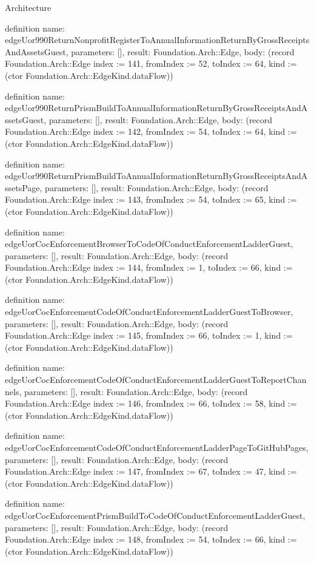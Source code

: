\begin{lexlean}{Architecture}
\begin{semanticmodule}
definition{
  name: edgeUor990ReturnNonprofitRegisterToAnnualInformationReturnByGrossReceiptsAndAssetsGuest,
  parameters: [],
  result: Foundation.Arch::Edge,
  body: (record Foundation.Arch::Edge {index := 141, fromIndex := 52, toIndex := 64, kind := (ctor Foundation.Arch::EdgeKind.dataFlow)})
}

definition{
  name: edgeUor990ReturnPrismBuildToAnnualInformationReturnByGrossReceiptsAndAssetsGuest,
  parameters: [],
  result: Foundation.Arch::Edge,
  body: (record Foundation.Arch::Edge {index := 142, fromIndex := 54, toIndex := 64, kind := (ctor Foundation.Arch::EdgeKind.dataFlow)})
}

definition{
  name: edgeUor990ReturnPrismBuildToAnnualInformationReturnByGrossReceiptsAndAssetsPage,
  parameters: [],
  result: Foundation.Arch::Edge,
  body: (record Foundation.Arch::Edge {index := 143, fromIndex := 54, toIndex := 65, kind := (ctor Foundation.Arch::EdgeKind.dataFlow)})
}

definition{
  name: edgeUorCocEnforcementBrowserToCodeOfConductEnforcementLadderGuest,
  parameters: [],
  result: Foundation.Arch::Edge,
  body: (record Foundation.Arch::Edge {index := 144, fromIndex := 1, toIndex := 66, kind := (ctor Foundation.Arch::EdgeKind.dataFlow)})
}

definition{
  name: edgeUorCocEnforcementCodeOfConductEnforcementLadderGuestToBrowser,
  parameters: [],
  result: Foundation.Arch::Edge,
  body: (record Foundation.Arch::Edge {index := 145, fromIndex := 66, toIndex := 1, kind := (ctor Foundation.Arch::EdgeKind.dataFlow)})
}

definition{
  name: edgeUorCocEnforcementCodeOfConductEnforcementLadderGuestToReportChannels,
  parameters: [],
  result: Foundation.Arch::Edge,
  body: (record Foundation.Arch::Edge {index := 146, fromIndex := 66, toIndex := 58, kind := (ctor Foundation.Arch::EdgeKind.dataFlow)})
}

definition{
  name: edgeUorCocEnforcementCodeOfConductEnforcementLadderPageToGitHubPages,
  parameters: [],
  result: Foundation.Arch::Edge,
  body: (record Foundation.Arch::Edge {index := 147, fromIndex := 67, toIndex := 47, kind := (ctor Foundation.Arch::EdgeKind.dataFlow)})
}

definition{
  name: edgeUorCocEnforcementPrismBuildToCodeOfConductEnforcementLadderGuest,
  parameters: [],
  result: Foundation.Arch::Edge,
  body: (record Foundation.Arch::Edge {index := 148, fromIndex := 54, toIndex := 66, kind := (ctor Foundation.Arch::EdgeKind.dataFlow)})
}


\end{semanticmodule}
\end{lexlean}
